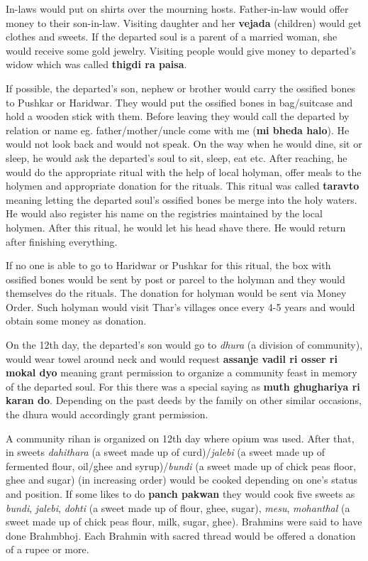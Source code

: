 In-laws would put on shirts over the mourning hosts. Father-in-law would offer
money to their son-in-law. Visiting daughter and her \textbf{vejada} (children)
would get clothes and sweets. If the departed soul is a parent of a married
woman, she would receive some gold jewelry. Visiting people would give money
to departed's widow which was called \textbf{thigdi ra paisa}.

If possible, the departed's son, nephew or brother would carry the ossified
bones to Pushkar or Haridwar. They would put the ossified bones in bag/suitcase
and hold a wooden stick with them. Before leaving they would call the departed
by relation or name eg. father/mother/uncle come with me (\textbf {mi bheda
halo}). He would not look back and would not speak. On the way when he would
dine, sit or sleep, he would ask the departed's soul to sit, sleep, eat etc.
After reaching, he would do the appropriate ritual with the help of local
holyman, offer meals to the holymen and appropriate donation for the rituals.
This ritual was called \textbf{taravto} meaning letting the departed soul's
ossified bones be merge into the holy waters. He would also register his name
on the registries maintained by the local holymen. After this ritual, he would
let his head shave there. He would return after finishing everything.

If no one is able to go to Haridwar or Pushkar for this ritual, the box with
ossified bones would be sent by post or parcel to the holyman and they would
themselves do the rituals. The donation for holyman would be sent via
Money Order. Such holyman would visit Thar's villages once every 4-5 years and
would obtain some money as donation.

On the 12th day, the departed's son would go to \textit{dhura} (a division of
community), would wear towel around neck and would request \textbf{assanje
vadil ri osser ri mokal dyo} meaning grant permission to organize a community
feast in memory of the departed soul. For this there was a special saying as
\textbf{muth ghughariya ri karan do}. Depending on the past deeds by the family
on other similar occasions, the dhura would accordingly grant permission.

A community rihan is organized on 12th day where opium was used. After that, in
sweets \textit{dahithara} (a sweet made up of curd)/\textit{jalebi} (a sweet
made up of fermented flour, oil/ghee and syrup)/\textit{bundi} (a sweet made up
of chick peas floor, ghee and sugar) (in increasing order) would be cooked
depending on one's status and position. If some likes to do \textbf{panch
pakwan} they would cook five sweets as \textit{bundi}, \textit{jalebi},
\textit{dohti} (a sweet made up of flour, ghee, sugar), \textit{mesu},
\textit{mohanthal} (a sweet made up of chick peas flour, milk, sugar, ghee).
Brahmins were said to have done Brahmbhoj. Each Brahmin with sacred thread
would be offered a donation of a rupee or more.

